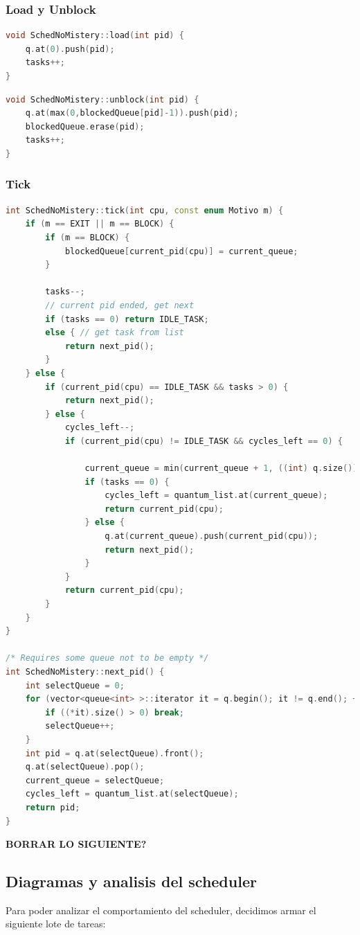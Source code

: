 \subsubsection{Load y Unblock}
\begin{lstlisting}[language=C++, breaklines=true]
void SchedNoMistery::load(int pid) {
	q.at(0).push(pid);
	tasks++;
}
\end{lstlisting}

\begin{lstlisting}[language=C++, breaklines=true]
void SchedNoMistery::unblock(int pid) {
	q.at(max(0,blockedQueue[pid]-1)).push(pid);
	blockedQueue.erase(pid);
	tasks++;
}
\end{lstlisting}


\subsubsection{Tick}
\begin{lstlisting}[language=C++, breaklines=true]
int SchedNoMistery::tick(int cpu, const enum Motivo m) {
	if (m == EXIT || m == BLOCK) {
		if (m == BLOCK) {
			blockedQueue[current_pid(cpu)] = current_queue;
		}
		
		tasks--;
		// current pid ended, get next
		if (tasks == 0) return IDLE_TASK;
		else { // get task from list
			return next_pid();
		}
	} else {
		if (current_pid(cpu) == IDLE_TASK && tasks > 0) {
			return next_pid();
		} else {
			cycles_left--;
			if (current_pid(cpu) != IDLE_TASK && cycles_left == 0) {

				current_queue = min(current_queue + 1, ((int) q.size()) - 1);
				if (tasks == 0) {
					cycles_left = quantum_list.at(current_queue);
					return current_pid(cpu);
				} else {
					q.at(current_queue).push(current_pid(cpu));
					return next_pid();
				}
			}
			return current_pid(cpu);
		}
	}
}

/* Requires some queue not to be empty */
int SchedNoMistery::next_pid() {
	int selectQueue = 0;
	for (vector<queue<int> >::iterator it = q.begin(); it != q.end(); ++it) {
		if ((*it).size() > 0) break;
		selectQueue++;
	}
	int pid = q.at(selectQueue).front();
	q.at(selectQueue).pop();
	current_queue = selectQueue;
	cycles_left = quantum_list.at(selectQueue);
	return pid;
}

\end{lstlisting}

\pagebreak

\textbf{BORRAR LO SIGUIENTE?}

\subsection{Diagramas y analisis del scheduler}
Para poder analizar el comportamiento del scheduler, decidimos armar el siguiente lote de tareas:


